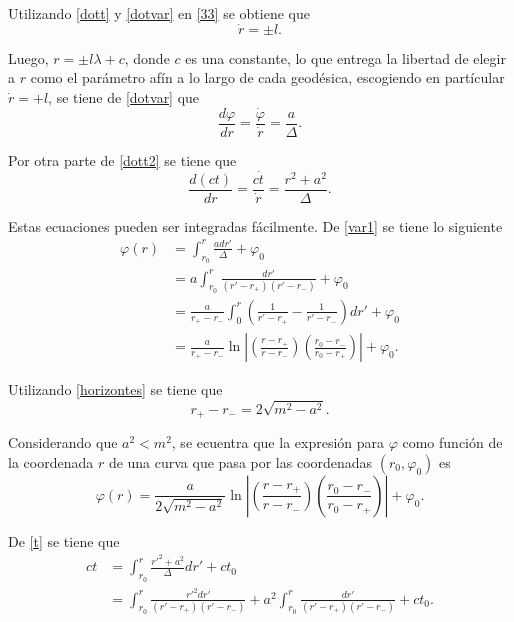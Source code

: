 Utilizando \eqref{dott} y \eqref{dotvar} en \eqref{33} se obtiene que
\begin{equation}
\dot{r}=\pm l.
\end{equation}

Luego, $r=\pm l\lambda+c$, donde $c$ es una constante, lo que entrega la libertad de elegir a $r$ como el parámetro afín a lo largo de cada geodésica, escogiendo en partícular $\dot{r}=+l$, se tiene de \eqref{dotvar} que
\begin{equation}\label{var1}
\frac{d \varphi}{dr}=\frac{\dot{\varphi}}{\dot{r}}=\frac{a}{\Delta}.
\end{equation}

Por otra parte de \eqref{dott2} se tiene que
\begin{equation}\label{t}
\frac{d(ct)}{dr}=\frac{c\dot{t}}{\dot{r}}=\frac{r^2+a^2}{\Delta}.
\end{equation}
 
Estas ecuaciones pueden ser integradas fácilmente. De \eqref{var1}  se tiene lo siguiente 
\begin{equation}
\begin{aligned}
\varphi(r)&=\int_{r_0}^r \frac{adr'}{\Delta} + \varphi_0\\
&=a\int_{r_0}^r\frac{dr'}{(r'-r_+)(r'-r_-)} + \varphi_0\\
&=\frac{a}{r_+-r_-}\int_{0}^r\left(\frac{1}{r'-r_+} - \frac{1}{r'-r_-} \right)dr'+\varphi_0\\
&=\frac{a}{r_+-r_-}\ln \left|\left(\frac{r-r_+}{r-r_-}\right)\left(\frac{r_0-r_-}{r_0-r_+} \right)\right| + \varphi_0.
\end{aligned}
\end{equation}
 
 Utilizando \eqref{horizontes} se tiene que 
 $$r_+-r_-=2\sqrt{m^2-a^2}.$$ 
 
 Considerando que $a^2<m^2$, se ecuentra que la expresión para $\varphi$ como función de la coordenada $r$ de una curva que pasa por las coordenadas $(r_0,\varphi_0)$ es
\begin{equation}\label{congphi}
\boxed{\varphi(r)=\frac{a}{2\sqrt{m^2-a^2}}\ln \left|\left(\frac{r-r_+}{r-r_-}\right)\left(\frac{r_0-r_-}{r_0-r_+} \right)\right| + \varphi_0.}
\end{equation}  

De \eqref{t} se tiene que
\begin{equation}
\begin{aligned}
ct&=\int_{r_0}^r\frac{r'^2+a^2}{\Delta}dr'+ct_0\\
&=\int_{r_0}^r \frac{r'^2dr'}{(r'-r_+)(r'-r_-)}+a^2\int_{r_0}^r\frac{dr'}{(r'-r_+)(r'-r_-)}+ct_0.\\
\end{aligned}
\end{equation}

